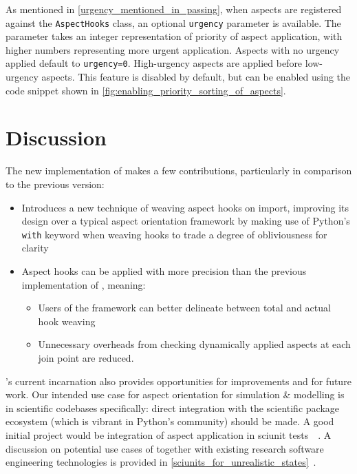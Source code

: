 As mentioned in \cref{urgency_mentioned_in_passing}, when aspects are registered
against the \lstinline{AspectHooks} class, an optional \lstinline{urgency}
parameter is available. The parameter takes an integer representation of
priority of aspect application, with higher numbers representing more urgent
application. Aspects with no urgency applied default to \lstinline{urgency=0}.
High-urgency aspects are applied before low-urgency aspects. This feature is
disabled by default, but can be enabled using the code snippet shown in
\cref{fig:enabling_priority_sorting_of_aspects}.


\section{Discussion}

The new implementation of \pdsf{} makes a few
contributions, particularly in comparison to the
previous version:

\begin{itemize}
    \item Introduces a new technique of weaving aspect hooks on import,
    improving its design over a typical aspect orientation framework by making
    use of Python's \lstinline{with} keyword when weaving hooks to trade a
    degree of obliviousness for clarity
    \item Aspect hooks can be applied with more precision than the previous
    implementation of \pdsf{}, meaning:
        \begin{itemize}
        \item Users of the framework can better delineate between total and
        actual hook weaving
        \item Unnecessary overheads from checking dynamically applied aspects at
        each join point are reduced.
        \end{itemize}
\end{itemize}

\pdsf{}'s current incarnation also provides opportunities for improvements and
for future work. Our intended use case for aspect orientation for simulation \&
modelling is in scientific codebases specifically: direct integration with the
scientific package ecosystem (which is vibrant in Python's community) should be
made. A good initial project would be integration of aspect application in
sciunit tests~\cite{sciunit_primer}~. A discussion on potential use cases of
\pdsf together with existing research software engineering technologies is
provided in \cref{sciunits_for_unrealistic_states}~.

